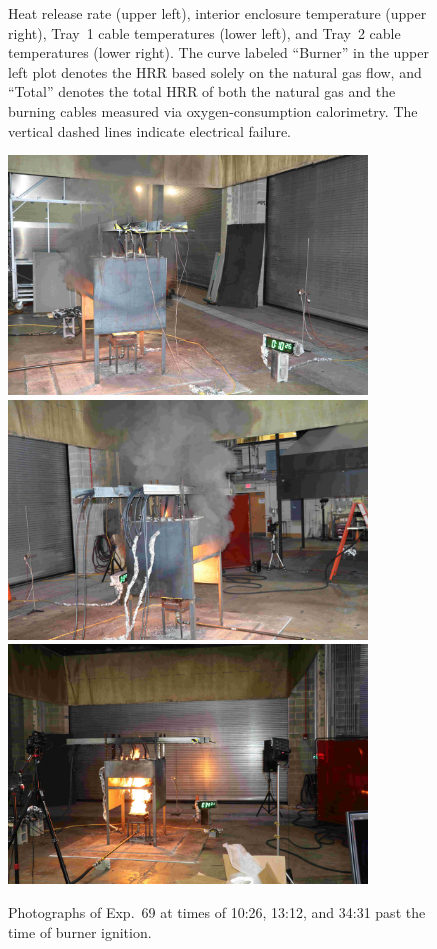 \begin{figure}[H]
\caption[HRR and temperatures of Exp.~69]{Heat release rate (upper left), interior enclosure temperature (upper right), Tray~1 cable temperatures (lower left), and Tray~2 cable temperatures (lower right). The curve labeled ``Burner'' in the upper left plot denotes the HRR based solely on the natural gas flow, and ``Total'' denotes the total HRR of both the natural gas and the burning cables measured via oxygen-consumption calorimetry. The vertical dashed lines indicate electrical failure.}
\label{fig:Test_69}
\end{figure}

\begin{figure}[p]
\centering
\includegraphics[height=2.50in]{../FIGURES/Test_69_Photo_1} \\ \vspace{0.1in}
\includegraphics[height=2.50in]{../FIGURES/Test_69_Photo_2} \\ \vspace{0.1in}
\includegraphics[height=2.50in]{../FIGURES/Test_69_Photo_3}
\caption[Photographs of Exp.~69]{Photographs of Exp.~69 at times of 10:26, 13:12, and 34:31 past the time of burner ignition.}
\label{fig:Test_69_photos}
\end{figure}



